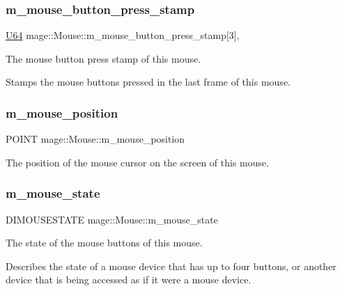 \subsubsection{\texorpdfstring{m\+\_\+mouse\+\_\+button\+\_\+press\+\_\+stamp}{m\_mouse\_button\_press\_stamp}}
{\footnotesize\ttfamily \hyperlink{namespacemage_a6672cf3c861707ce4a3235a3eb43941d}{U64} mage\+::\+Mouse\+::m\+\_\+mouse\+\_\+button\+\_\+press\+\_\+stamp\mbox{[}3\mbox{]}\hspace{0.3cm}{\ttfamily [mutable]}, {\ttfamily [private]}}

The mouse button press stamp of this mouse.

Stamps the mouse buttons pressed in the last frame of this mouse. \hypertarget{classmage_1_1_mouse_a2a8332ef7a4daa0f9ed48a9a1ad80684}{}\label{classmage_1_1_mouse_a2a8332ef7a4daa0f9ed48a9a1ad80684} 
\subsubsection{\texorpdfstring{m\+\_\+mouse\+\_\+position}{m\_mouse\_position}}
{\footnotesize\ttfamily P\+O\+I\+NT mage\+::\+Mouse\+::m\+\_\+mouse\+\_\+position\hspace{0.3cm}{\ttfamily [private]}}

The position of the mouse cursor on the screen of this mouse. \hypertarget{classmage_1_1_mouse_af99645fb4226077abee4532a5e663066}{}\label{classmage_1_1_mouse_af99645fb4226077abee4532a5e663066} 
\subsubsection{\texorpdfstring{m\+\_\+mouse\+\_\+state}{m\_mouse\_state}}
{\footnotesize\ttfamily D\+I\+M\+O\+U\+S\+E\+S\+T\+A\+TE mage\+::\+Mouse\+::m\+\_\+mouse\+\_\+state\hspace{0.3cm}{\ttfamily [private]}}

The state of the mouse buttons of this mouse.

Describes the state of a mouse device that has up to four buttons, or another device that is being accessed as if it were a mouse device. \hypertarget{classmage_1_1_mouse_a7633df92a818760b3efe694d4688961c}{}\label{classmage_1_1_mouse_a7633df92a818760b3efe694d4688961c} 
